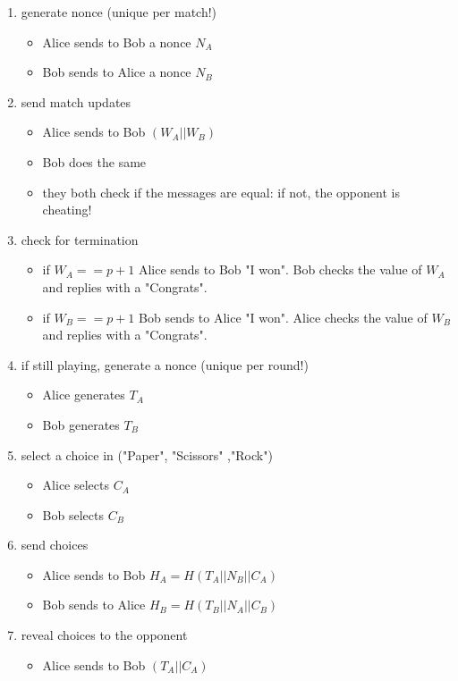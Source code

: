 \documentclass[11 pt]{article}
\begin{document}
\begin{enumerate}
	\item generate nonce (unique per match!)
	\begin{itemize}
		\item Alice sends to Bob a nonce $N_A$
		\item Bob sends to Alice a nonce $N_B$
	\end{itemize}
	\item send match updates
	\begin{itemize}
		\item Alice sends to Bob $(W_A || W_B)$
		\item Bob does the same
		\item they both check if the messages are equal: if not, the opponent is cheating!
	\end{itemize}
	\item check for termination
	\begin{itemize}
		\item if $W_A == p+1$ Alice sends to Bob "I won". Bob checks the value of $W_A$ and replies with a "Congrats".
		\item if $W_B == p+1$ Bob sends to Alice "I won". Alice checks the value of $W_B$ and replies with a "Congrats".
	\end{itemize}
	\item if still playing, generate a nonce (unique per round!)
	\begin{itemize}
		\item Alice generates $T_A$
		\item Bob generates $T_B$
	\end{itemize}
	\item select a choice in ("Paper", "Scissors" ,"Rock")
	\begin{itemize}
		\item Alice selects $C_A$
		\item Bob selects $C_B$
	\end{itemize}
	\item send choices
	\begin{itemize}
		\item Alice sends to Bob $H_A = H( T_A || N_B || C_A )$
		\item Bob sends to Alice $H_B = H( T_B || N_A || C_B )$
	\end{itemize}
	\item reveal choices to the opponent
	\begin{itemize}
		\item Alice sends to Bob $(T_A || C_A)$

\end{itemize}
\end{enumerate}
\end{document}
